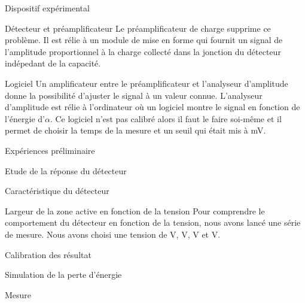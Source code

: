 \documentclass[a4paper,11pt]{scrartcl}
\begin{document}
\begin{section}{Dispositif expérimental}
\begin{subsection}{Détecteur et préamplificateur}
    Le préamplificateur de charge supprime ce problème. Il est rélie à un module de mise en forme qui fournit un signal de l'amplitude proportionnel à la charge collecté dans la jonction du détecteur indépedant de la capacité.
   \end{subsection}

   \begin{subsection}{Logiciel}
    Un amplificateur entre le préamplificateur et l'analyseur d'amplitude donne la possibilité d'ajuster le signal à un valeur connue. L'analyseur d'amplitude est rélie à l'ordinateur où un logiciel montre le signal en fonction de l'énergie d'$\alpha$. Ce logiciel n'est pas calibré alors il faut le faire soi-même et il permet de choisir la temps de la mesure et un seuil qui était mis à \unit[200]{mV}.
   \end{subsection}
  \end{section}
  
  \begin{section}{Expériences préliminaire}
   \begin{subsection}{Etude de la réponse du détecteur}
    \begin{subsubsection}{Caractéristique du détecteur}
    \end{subsubsection}
    \begin{subsubsection}{Largeur de la zone active en fonction de la tension}
     Pour comprendre le comportement du détecteur en fonction de la tension, nous avons lancé une série de mesure. Nous avons choisi une tension de \unit[0]{V}, \unit[25]{V}, \unit[50]{V} et \unit[80]{V}.
    \end{subsubsection}
  \end{subsection} 

  \begin{subsection}{Calibration des résultat}
    
  \end{subsection}
  
  \begin{subsection}{Simulation de la perte d'énergie}
   
  \end{subsection}
 \end{section}

 \begin{section}{Mesure}
  
 \end{section}
\end{document}
